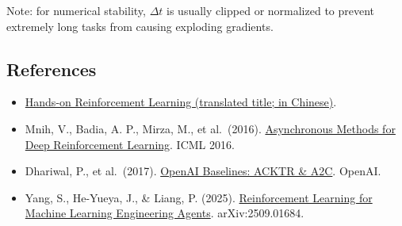 Note: for numerical stability, \(\Delta t\) is usually clipped or normalized to prevent extremely long tasks from causing exploding gradients.

\FloatBarrier
{}
\hypertarget{references-45}{%
\subsection{References}\label{references-45}}

\vspace{0.25em}
\begin{itemize}
\tightlist
\item
  \href{https://hrl.boyuai.com/}{Hands-on Reinforcement Learning (translated title; in Chinese)}.
\item
  Mnih, V., Badia, A. P., Mirza, M., et al.~(2016). \href{https://proceedings.mlr.press/v48/mniha16.html}{Asynchronous Methods for Deep Reinforcement Learning}. ICML 2016.
\item
  Dhariwal, P., et al.~(2017). \href{https://openai.com/index/openai-baselines-acktr-a2c/}{OpenAI Baselines: ACKTR \& A2C}. OpenAI.
\item
  Yang, S., He-Yueya, J., \& Liang, P. (2025). \href{https://arxiv.org/abs/2509.01684}{Reinforcement Learning for Machine Learning Engineering Agents}. arXiv:2509.01684.
\end{itemize}

\clearpage
